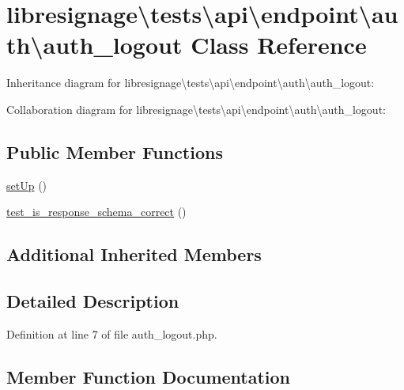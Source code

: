 \hypertarget{classlibresignage_1_1tests_1_1api_1_1endpoint_1_1auth_1_1auth__logout}{}\section{libresignage\textbackslash{}tests\textbackslash{}api\textbackslash{}endpoint\textbackslash{}auth\textbackslash{}auth\+\_\+logout Class Reference}
\label{classlibresignage_1_1tests_1_1api_1_1endpoint_1_1auth_1_1auth__logout}


Inheritance diagram for libresignage\textbackslash{}tests\textbackslash{}api\textbackslash{}endpoint\textbackslash{}auth\textbackslash{}auth\+\_\+logout\+:


Collaboration diagram for libresignage\textbackslash{}tests\textbackslash{}api\textbackslash{}endpoint\textbackslash{}auth\textbackslash{}auth\+\_\+logout\+:
\subsection*{Public Member Functions}
\begin{DoxyCompactItemize}
\item 
\hyperlink{classlibresignage_1_1tests_1_1api_1_1endpoint_1_1auth_1_1auth__logout_a97e118eb6ef57abb4648a409ae3df018}{set\+Up} ()
\item 
\hyperlink{classlibresignage_1_1tests_1_1api_1_1endpoint_1_1auth_1_1auth__logout_a956d2ba3ade150d26d0400fcabe7730b}{test\+\_\+is\+\_\+response\+\_\+schema\+\_\+correct} ()
\end{DoxyCompactItemize}
\subsection*{Additional Inherited Members}


\subsection{Detailed Description}


Definition at line 7 of file auth\+\_\+logout.\+php.



\subsection{Member Function Documentation}
\mbox{\label{classlibresignage_1_1tests_1_1api_1_1endpoint_1_1auth_1_1auth__logout_a97e118eb6ef57abb4648a409ae3df018}} 
